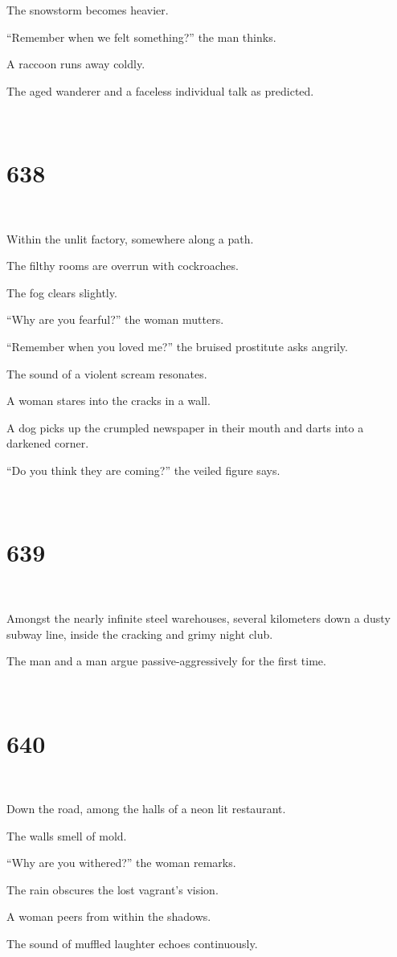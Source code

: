 \documentclass{report}
\begin{document}
The snowstorm becomes heavier.

``Remember when we felt something?'' the man thinks.

A raccoon runs away coldly.

The aged wanderer and a faceless individual talk as predicted.

~
\chapter*{638}
~

Within the unlit factory, somewhere along a path.

The filthy rooms are overrun with cockroaches.

The fog clears slightly.

``Why are you fearful?'' the woman mutters.

``Remember when you loved me?'' the bruised prostitute asks angrily.

The sound of a violent scream resonates.

A woman stares into the cracks in a wall.

A dog picks up the crumpled newspaper in their mouth and darts into a darkened corner.

``Do you think they are coming?'' the veiled figure says.

~
\chapter*{639}
~

Amongst the nearly infinite steel warehouses, several kilometers down a dusty subway line, inside the cracking and grimy night club.

The man and a man argue passive-aggressively for the first time.

~
\chapter*{640}
~

Down the road, among the halls of a neon lit restaurant.

The walls smell of mold.

``Why are you withered?'' the woman remarks.

The rain obscures the lost vagrant's vision.

A woman peers from within the shadows.

The sound of muffled laughter echoes continuously.
\end{document}
